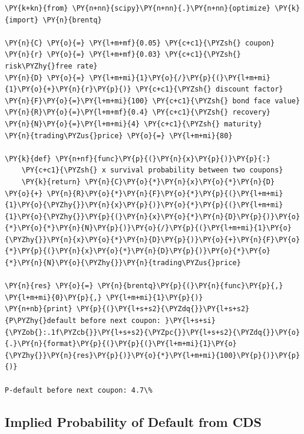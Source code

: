 \begin{tcolorbox}[breakable, size=fbox, boxrule=1pt, pad at break*=1mm,colback=cellbackground, colframe=cellborder]
\begin{Verbatim}[commandchars=\\\{\}]
\PY{k+kn}{from} \PY{n+nn}{scipy}\PY{n+nn}{.}\PY{n+nn}{optimize} \PY{k}{import} \PY{n}{brentq}
	
\PY{n}{C} \PY{o}{=} \PY{l+m+mf}{0.05} \PY{c+c1}{\PYZsh{} coupon}
\PY{n}{r} \PY{o}{=} \PY{l+m+mf}{0.03} \PY{c+c1}{\PYZsh{} risk\PYZhy{}free rate}
\PY{n}{D} \PY{o}{=} \PY{l+m+mi}{1}\PY{o}{/}\PY{p}{(}\PY{l+m+mi}{1}\PY{o}{+}\PY{n}{r}\PY{p}{)} \PY{c+c1}{\PYZsh{} discount factor}
\PY{n}{F}\PY{o}{=}\PY{l+m+mi}{100} \PY{c+c1}{\PYZsh{} bond face value}
\PY{n}{R}\PY{o}{=}\PY{l+m+mf}{0.4} \PY{c+c1}{\PYZsh{} recovery}
\PY{n}{N}\PY{o}{=}\PY{l+m+mi}{4} \PY{c+c1}{\PYZsh{} maturity}
\PY{n}{trading\PYZus{}price} \PY{o}{=} \PY{l+m+mi}{80}
	
\PY{k}{def} \PY{n+nf}{func}\PY{p}{(}\PY{n}{x}\PY{p}{)}\PY{p}{:}
	\PY{c+c1}{\PYZsh{} x survival probability between two coupons}
	\PY{k}{return} \PY{n}{C}\PY{o}{*}\PY{n}{x}\PY{o}{*}\PY{n}{D} \PY{o}{+} \PY{n}{R}\PY{o}{*}\PY{n}{F}\PY{o}{*}\PY{p}{(}\PY{l+m+mi}{1}\PY{o}{\PYZhy{}}\PY{n}{x}\PY{p}{)}\PY{o}{*}\PY{p}{(}\PY{l+m+mi}{1}\PY{o}{\PYZhy{}}\PY{p}{(}\PY{n}{x}\PY{o}{*}\PY{n}{D}\PY{p}{)}\PY{o}{*}\PY{o}{*}\PY{n}{N}\PY{p}{)}\PY{o}{/}\PY{p}{(}\PY{l+m+mi}{1}\PY{o}{\PYZhy{}}\PY{n}{x}\PY{o}{*}\PY{n}{D}\PY{p}{)}\PY{o}{+}\PY{n}{F}\PY{o}{*}\PY{p}{(}\PY{n}{x}\PY{o}{*}\PY{n}{D}\PY{p}{)}\PY{o}{*}\PY{o}{*}\PY{n}{N}\PY{o}{\PYZhy{}}\PY{n}{trading\PYZus{}price}
	
\PY{n}{res} \PY{o}{=} \PY{n}{brentq}\PY{p}{(}\PY{n}{func}\PY{p}{,} \PY{l+m+mi}{0}\PY{p}{,} \PY{l+m+mi}{1}\PY{p}{)}
\PY{n+nb}{print} \PY{p}{(}\PY{l+s+s2}{\PYZdq{}}\PY{l+s+s2}{P\PYZhy{}default before next coupon: }\PY{l+s+si}{\PYZob{}:.1f\PYZcb{}}\PY{l+s+s2}{\PYZpc{}}\PY{l+s+s2}{\PYZdq{}}\PY{o}{.}\PY{n}{format}\PY{p}{(}\PY{p}{(}\PY{l+m+mi}{1}\PY{o}{\PYZhy{}}\PY{n}{res}\PY{p}{)}\PY{o}{*}\PY{l+m+mi}{100}\PY{p}{)}\PY{p}{)}

P-default before next coupon: 4.7\%
\end{Verbatim}
\end{tcolorbox}

\subsection{Implied Probability of Default from CDS}\label{default-probabilities-and-cds}

